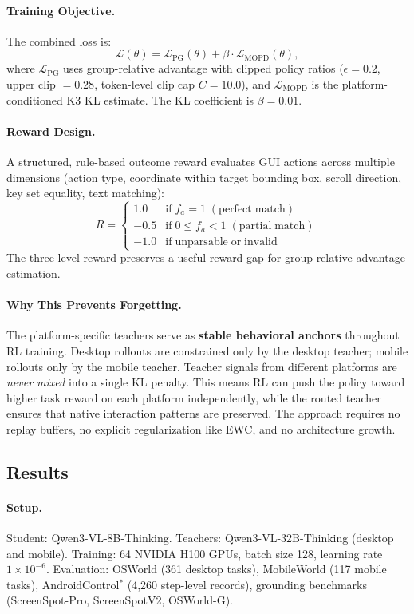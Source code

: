 \documentclass[11pt,a4paper]{article}
\begin{document}
\paragraph{Training Objective.} The combined loss is:
\[
\mathcal{L}(\theta) = \mathcal{L}_{\mathrm{PG}}(\theta) + \beta \cdot \mathcal{L}_{\mathrm{MOPD}}(\theta),
\]
where $\mathcal{L}_{\mathrm{PG}}$ uses group-relative advantage with clipped policy ratios ($\epsilon = 0.2$, upper clip $= 0.28$, token-level clip cap $C = 10.0$), and $\mathcal{L}_{\mathrm{MOPD}}$ is the platform-conditioned K3 KL estimate. The KL coefficient is $\beta = 0.01$.

\paragraph{Reward Design.} A structured, rule-based outcome reward evaluates GUI actions across multiple dimensions (action type, coordinate within target bounding box, scroll direction, key set equality, text matching):
\[
R = \begin{cases} 1.0 & \mathrm{if}\; f_a = 1 \;\mathrm{(perfect\;match)} \\ -0.5 & \mathrm{if}\; 0 \leq f_a < 1 \;\mathrm{(partial\;match)} \\ -1.0 & \mathrm{if\;unparsable\;or\;invalid} \end{cases}
\]
The three-level reward preserves a useful reward gap for group-relative advantage estimation.

\paragraph{Why This Prevents Forgetting.} The platform-specific teachers serve as \textbf{stable behavioral anchors} throughout RL training. Desktop rollouts are constrained only by the desktop teacher; mobile rollouts only by the mobile teacher. Teacher signals from different platforms are \emph{never mixed} into a single KL penalty. This means RL can push the policy toward higher task reward on each platform independently, while the routed teacher ensures that native interaction patterns are preserved. The approach requires no replay buffers, no explicit regularization like EWC, and no architecture growth.

\subsection{Results}

\paragraph{Setup.} Student: Qwen3-VL-8B-Thinking. Teachers: Qwen3-VL-32B-Thinking (desktop and mobile). Training: 64 NVIDIA H100 GPUs, batch size 128, learning rate $1\times10^{-6}$. Evaluation: OSWorld (361 desktop tasks), MobileWorld (117 mobile tasks), AndroidControl$^*$ (4,260 step-level records), grounding benchmarks (ScreenSpot-Pro, ScreenSpotV2, OSWorld-G).
\end{document}
